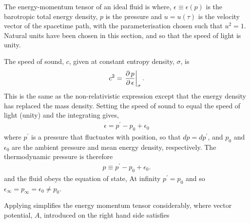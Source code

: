 The energy-momentum tensor of an ideal fluid is\cite{Doran2003}
where, $\epsilon \equiv \epsilon(p)$ is the barotropic total energy density,
$p$ is the pressure
and 
$u=u(\tau)$ is the velocity vector of the spacetime path, with the parameterisation chosen such that $u^2 = 1$. %
Natural units have been chosen in this section, and so that the speed of light is unity.

The speed of sound, $c$,  given at constant entropy density, $\sigma$, is\cite{LandauBook,Taub1978} 
\begin{align}
  c^2 = \left.{\frac{\operatorname{\partial} p}{\operatorname{\partial} \epsilon}}\right|_{\sigma}. \label{eqn:soundspeed}
\end{align}
This is the same as the non-relativistic expression except that the energy density has replaced the mass density.
Setting the speed of sound to equal the speed of light (unity) and the integrating 
 gives,
 \begin{align}
   \epsilon = p^\prime - p_0 + \epsilon_0
 \end{align} 
where $p^\prime$ is a pressure that fluctuates with position, so that $dp = dp^\prime$,
and $p_0$  and $\epsilon_0$  are the ambient  pressure and mean energy density, respectively.
The thermodynamic pressure is therefore
\begin{align}
  p \equiv p^\prime - p_0 + \epsilon_0. \label{eqn:pshort}
\end{align}
and the fluid obeys the equation of state, 
At infinity $p^\prime = p_0$ 
and so $\epsilon_\infty = p_\infty = \epsilon_0 \ne p_0$.




Applying  simplifies the energy momentum tensor considerably,
where vector potential, $A$, introduced on the right hand side satisfies

